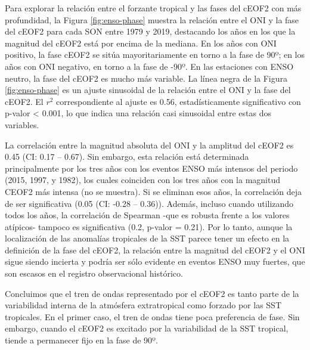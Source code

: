 \documentclass[12pt,oneside]{reedthesis}
\begin{document}
Para explorar la relación entre el forzante tropical y las fases del cEOF2 con más profundidad, la Figura \ref{fig:enso-phase} muestra la relación entre el ONI y la fase del cEOF2 para cada SON entre 1979 y 2019, destacando los años en los que la magnitud del cEOF2 está por encima de la mediana.
En los años con ONI positivo, la fase cEOF2 se sitúa mayoritariamente en torno a la fase de 90º; en los años con ONI negativo, en torno a la fase de -90º.
En las estaciones con ENSO neutro, la fase del cEOF2 es mucho más variable.
La línea negra de la Figura \ref{fig:enso-phase} es un ajuste sinusoidal de la relación entre el ONI y la fase del cEOF2.
El \(r^2\) correspondiente al ajuste es 0.56, estadísticamente significativo con p-valor \textless{} 0.001, lo que indica una relación casi sinusoidal entre estas dos variables.

La correlación entre la magnitud absoluta del ONI y la amplitud del cEOF2 es 0.45 (CI: 0.17 -- 0.67).
Sin embargo, esta relación está determinada principalmente por los tres años con los eventos ENSO más intensos del periodo (2015, 1997, y 1982), los cuales coinciden con los tres años con la magnitud CEOF2 más intensa (no se muestra).
Si se eliminan esos años, la correlación deja de ser significativa (0.05 (CI: -0.28 -- 0.36)).
Además, incluso cuando utilizando todos los años, la correlación de Spearman -que es robusta frente a los valores atípicos- tampoco es significativa (0.2, p-valor = 0.21).
Por lo tanto, aunque la localización de las anomalías tropicales de la SST parece tener un efecto en la definición de la fase del cEOF2, la relación entre la magnitud del cEOF2 y el ONI sigue siendo incierta y podría ser sólo evidente en eventos ENSO muy fuertes, que son escasos en el registro observacional histórico.

Concluimos que el tren de ondas representado por el cEOF2 es tanto parte de la variabilidad interna de la atmósfera extratropical como forzado por las SST tropicales.
En el primer caso, el tren de ondas tiene poca preferencia de fase.
Sin embargo, cuando el cEOF2 es excitado por la variabilidad de la SST tropical, tiende a permanecer fijo en la fase de 90º.
\end{document}
